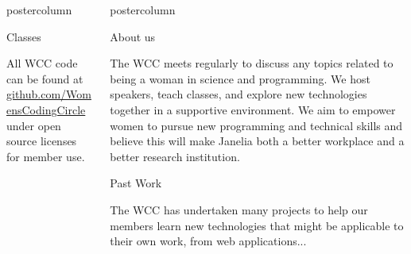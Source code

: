 \documentclass{beamer}
\newlength{\columnheight}
\begin{document}
\begin{frame}
\begin{columns}
\begin{column}{.33\textwidth}
\begin{beamercolorbox}[center,wd=\textwidth]{postercolumn}
\begin{minipage}[T]{.95\textwidth}
{\begin{myblock}{Classes}
\begin{addmargin}[1em]{1em}
\begin{figure}
                            \end{figure}
                        \end{addmargin}
                        \vspace{1.6cm}
                        \begin{addmargin}[1em]{1em}
                            All WCC code can be found at \url{github.com/WomensCodingCircle} under open source licenses for member use.
                        \end{addmargin}

                    \end{myblock}\vfill
                    
		}\end{minipage}\end{beamercolorbox}
	\end{column}
  \begin{column}{.33\textwidth}
		\begin{beamercolorbox}[center,wd=\textwidth]{postercolumn}
			\begin{minipage}[T]{.95\textwidth}
				\parbox[t][\columnheight]{\textwidth}{
					\begin{myblock}{About us}
                        \begin{addmargin}[1em]{1em}
                            The WCC meets regularly to discuss any topics related to being a woman in science and programming. We host speakers, teach classes, and explore new technologies together in a supportive environment. We aim to empower women to pursue new programming and technical skills and believe this will make Janelia both a better workplace and a better research institution. 
                        \end{addmargin}
                    \end{myblock}
                    \vspace{1cm}
                    \begin{myblock}{Past Work}
                        \begin{addmargin}[.5em]{.5em}
                            The WCC has undertaken many projects to help our members learn new technologies that might be applicable to their own work, from web applications...
                        \end{addmargin}
                        \begin{addmargin}[1em]{1em}
                            \begin{figure}
                                \vspace{.5cm}

\end{figure}
\end{addmargin}
\end{myblock}}
\end{minipage}
\end{beamercolorbox}
\end{column}
\end{columns}
\end{frame}
\end{document}
